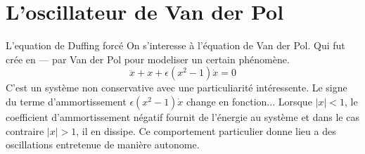 \chapter{L'oscillateur de Van der Pol}

L'equation de Duffing forcé
On s'interesse à l'équation de Van der Pol. Qui fut crée en --- par Van der Pol pour modeliser un certain phénomène.
\begin{equation}
    \ddot{x} + x + \epsilon(x^2 - 1)\dot{x} = 0
    \label{eq:vdp}
\end{equation}
C'est un système non conservative avec une particuliarité intéressente. 
Le signe du terme d'ammortissement $\epsilon(x^2 - 1)\dot{x}$ change en fonction... 
Lorsque $|x|<1$, le coefficient d'ammortissement négatif fournit de l'énergie au système et dans le cas contraire $|x|>1$, il en dissipe. 
Ce comportement particulier donne lieu a des oscillations entretenue de manière autonome.

